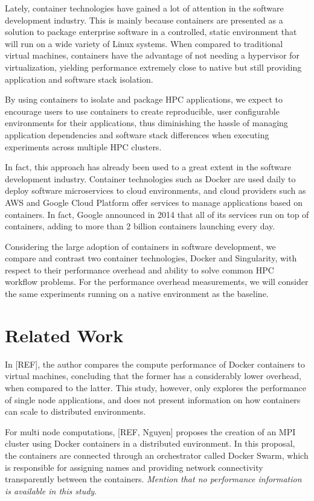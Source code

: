 \documentclass[12pt]{article}
\begin{document}
Lately, container technologies have gained a lot of attention in the software development industry. This is mainly because containers are presented as a solution to package enterprise software in a controlled, static environment that will run on a wide variety of Linux systems. When compared to traditional virtual machines, containers have the advantage of not needing a hypervisor for virtualization, yielding performance extremely close to native but still providing application and software stack isolation.

By using containers to isolate and package HPC applications, we expect to encourage users to use containers to create reproducible, user configurable environments for their applications, thus diminishing the hassle of managing application dependencies and software stack differences when executing experiments across multiple HPC clusters.

In fact, this approach has already been used to a great extent in the software development industry. Container technologies such as Docker are used daily to deploy software microservices to cloud environments, and cloud providers such as AWS and Google Cloud Platform offer services to manage applications based on containers. In fact, Google announced in 2014 that all of its services run on top of containers, adding to more than 2 billion containers launching every day.

Considering the large adoption of containers in software development, we compare and contrast two container technologies, Docker and Singularity, with respect to their performance overhead and ability to solve common HPC workflow problems. For the performance overhead measurements, we will consider the same experiments running on a native environment as the baseline.

\section{Related Work} \label{sec.relatedwork}
In [REF], the author compares the compute performance of Docker containers to virtual machines, concluding that the former has a considerably lower overhead, when compared to the latter. This study, however, only explores the performance of single node applications, and does not present information on how containers can scale to distributed environments.

For multi node computations, [REF, Nguyen] proposes the creation of an MPI cluster using Docker containers in a distributed environment. In this proposal, the containers are connected through an orchestrator called Docker Swarm, which is responsible for assigning names and providing network connectivity transparently between the containers. \textit{Mention that no performance information is available in this study}.
\end{document}
